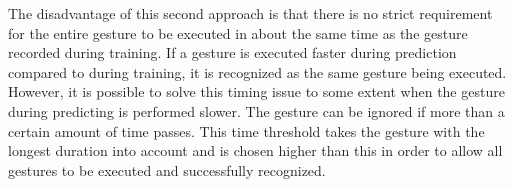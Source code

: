 The disadvantage of this second approach is that there is no strict requirement for the entire gesture to be executed in about the same time as the gesture recorded during training. If a gesture is executed faster during prediction compared to during training, it is recognized as the same gesture being executed. However, it is possible to solve this timing issue to some extent when the gesture during predicting is performed slower. The gesture can be ignored if more than a certain amount of time passes. This time threshold takes the gesture with the longest duration into account and is chosen higher than this in order to allow all gestures to be executed and successfully recognized.